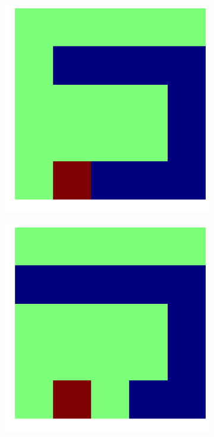 \documentclass{article}
\begin{document}
\begin{figure}[!htpb]
\begin{subfigure}[b]{.19\linewidth}
  \end{subfigure}
  \begin{subfigure}[b]{.19\linewidth}
    \includegraphics[width=\linewidth]{snake_70.png}
  \end{subfigure}
  \begin{subfigure}[b]{.19\linewidth}
    \includegraphics[width=\linewidth]{snake_71.png}

\end{subfigure}
\end{figure}
\end{document}
